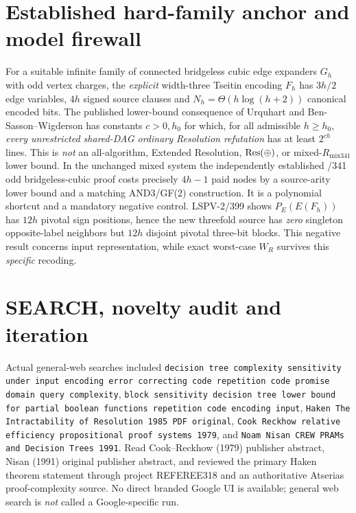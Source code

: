 \documentclass[11pt]{article}
\begin{document}
\section*{Established hard-family anchor and model firewall}
For a suitable infinite family of connected bridgeless cubic edge expanders \(G_h\) with odd vertex charges, the \emph{explicit} width-three Tseitin encoding \(F_h\) has \(3h/2\) edge variables, \(4h\) signed source clauses and \(N_h=\Theta(h\log(h+2))\) canonical encoded bits. The published lower-bound consequence of Urquhart and Ben-Sasson--Wigderson has constants \(c>0,h_0\) for which, for all admissible \(h\ge h_0\), \emph{every unrestricted shared-DAG ordinary Resolution refutation} has at least \(2^{ch}\) lines. This is \emph{not} an all-algorithm, Extended Resolution, \({\rm Res}(\oplus)\), or mixed-\(R_{\mathrm{mix341}}\) lower bound. In the unchanged mixed system the independently established /341 odd bridgeless-cubic proof costs precisely \(4h-1\) paid nodes by a source-arity lower bound and a matching AND3/GF(2) construction. It is a polynomial shortcut and a mandatory negative control. LSPV-2/399 shows \(P_E(E(F_h))\) has \(12h\) pivotal sign positions, hence the new threefold source has \emph{zero} singleton opposite-label neighbors but \(12h\) disjoint pivotal three-bit blocks. This negative result concerns input representation, while exact worst-case \(W_R\) survives this \emph{specific} recoding.

\section*{SEARCH, novelty audit and iteration}
Actual general-web searches included \texttt{decision tree complexity sensitivity under input encoding error correcting code repetition code promise domain query complexity}, \texttt{block sensitivity decision tree lower bound for partial boolean functions repetition code encoding input}, \texttt{Haken The Intractability of Resolution 1985 PDF original}, \texttt{Cook Reckhow relative efficiency propositional proof systems 1979}, and \texttt{Noam Nisan CREW PRAMs and Decision Trees 1991}. Read Cook--Reckhow (1979) publisher abstract, Nisan (1991) original publisher abstract, and reviewed the primary Haken theorem statement through project REFEREE318 and an authoritative Atserias proof-complexity source. No direct branded Google UI is available; general web search is \emph{not} called a Google-specific run.
\end{document}
